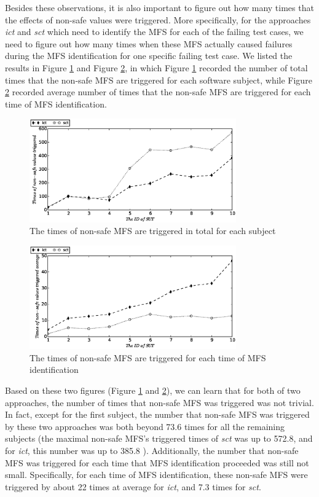 \documentclass[journal,12pt,onecolumn,draftclsnofoot,]{IEEEtran}
\begin{document}
Besides these observations, it is also important to figure out how many times that the effects of non-safe values were triggered. More specifically, for the approaches \emph{ict} and \emph{sct} which need to identify the MFS for each of the failing test cases, we need to figure out how many times when these MFS actually caused failures during the MFS identification for one specific failing test case. We listed the results in Figure \ref{sen_safe_NonTrigger} and Figure \ref{sen_safe_NonTriggerAvg}, in which Figure \ref{sen_safe_NonTrigger} recorded the number of total times that the non-safe MFS are triggered for each software subject, while Figure \ref{sen_safe_NonTriggerAvg} recorded average number of times that the non-safe MFS are triggered for each time of MFS identification.

\begin{figure}[htbp]
 \includegraphics[width=3.5in]{enNonSafe.eps}
\caption{The times of non-safe MFS are triggered in total for each subject}
\label{sen_safe_NonTrigger}
\end{figure}


\begin{figure}[htbp]
 \includegraphics[width=3.5in]{enNonSafeTriggerAvg.eps}
\caption{The times of non-safe MFS are triggered for each time of MFS identification}
\label{sen_safe_NonTriggerAvg}
\end{figure}

Based on these two figures (Figure \ref{sen_safe_NonTrigger} and \ref{sen_safe_NonTriggerAvg}), we can learn that for both of two approaches, the number of times that non-safe MFS was triggered was not trivial. In fact, except for the first subject, the number that non-safe MFS was triggered by these two approaches was both beyond 73.6 times for all the remaining subjects (the maximal non-safe MFS's triggered times of \emph{sct} was up to 572.8, and for \emph{ict}, this number was up to 385.8 ). Additionally, the number that non-safe MFS was triggered for each time that MFS identification proceeded was still not small. Specifically, for each time of MFS identification, these non-safe MFS were  triggered by about 22 times at average for \emph{ict}, and 7.3 times for \emph{sct}.
\end{document}
